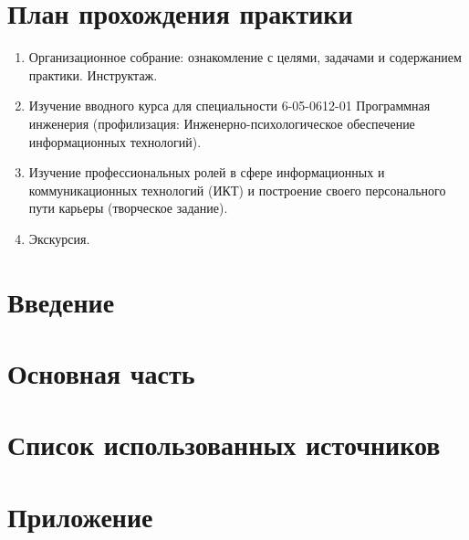 \documentclass[variant=practice]{bsuir}
\begin{document}
\maketitle

\tableofcontents

\chapter{План прохождения практики}

\begin{enumerate}

    \item Организационное собрание: ознакомление с целями, задачами и
    содержанием практики. Инструктаж.

    \item Изучение вводного курса  для
    специальности 6-05-0612-01 Программная инженерия (профилизация:
    Инженерно-психологическое обеспечение информационных технологий).

    \item Изучение профессиональных ролей в сфере информационных и
    коммуникационных технологий (ИКТ) и построение своего персонального пути
    карьеры (творческое задание).

    \item Экскурсия.

\end{enumerate}

\chapter{Введение}

\chapter{Основная часть}

\chapter{Список использованных источников}

\chapter{Приложение}
\end{document}
